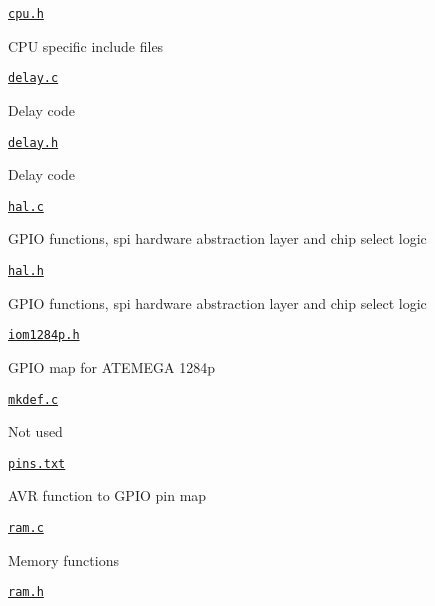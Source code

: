 \begin{DoxyItemize}
\begin{DoxyItemize}
\begin{DoxyItemize}
\end{DoxyItemize}
\item \href{hardware/cpu.h}{\tt cpu.\+h}
\begin{DoxyItemize}
\item C\+PU specific include files
\end{DoxyItemize}
\item \href{hardware/delay.c}{\tt delay.\+c}
\begin{DoxyItemize}
\item Delay code
\end{DoxyItemize}
\item \href{hardware/delay.h}{\tt delay.\+h}
\begin{DoxyItemize}
\item Delay code
\end{DoxyItemize}
\item \href{hardware/hal.c}{\tt hal.\+c}
\begin{DoxyItemize}
\item G\+P\+IO functions, spi hardware abstraction layer and chip select logic
\end{DoxyItemize}
\item \href{hardware/hal.h}{\tt hal.\+h}
\begin{DoxyItemize}
\item G\+P\+IO functions, spi hardware abstraction layer and chip select logic
\end{DoxyItemize}
\item \href{hardware/iom1284p.h}{\tt iom1284p.\+h}
\begin{DoxyItemize}
\item G\+P\+IO map for A\+T\+E\+M\+E\+GA 1284p
\end{DoxyItemize}
\item \href{hardware/mkdef.c}{\tt mkdef.\+c}
\begin{DoxyItemize}
\item Not used
\end{DoxyItemize}
\item \href{hardware/pins.txt}{\tt pins.\+txt}
\begin{DoxyItemize}
\item A\+VR function to G\+P\+IO pin map
\end{DoxyItemize}
\item \href{hardware/ram.c}{\tt ram.\+c}
\begin{DoxyItemize}
\item Memory functions
\end{DoxyItemize}
\item \href{hardware/ram.h}{\tt ram.\+h}

\end{DoxyItemize}
\end{DoxyItemize}
